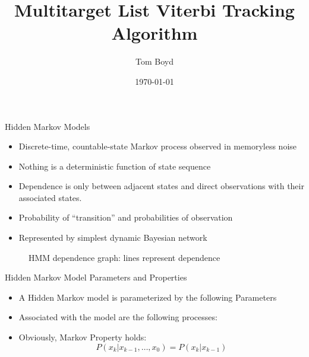 \documentclass[xetex,mathserif,serif]{beamer}
\title {Multitarget List Viterbi Tracking Algorithm}
\author {Tom Boyd}
\institute[SciTec] %
{
  SciTec Inc.\\
  100 Wall Street\\
  Princeton, NJ 08540
}
\date{\today}
\begin{document}
\frame{\titlepage}

\begin{frame}{Hidden Markov Models}
    \begin{itemize}
        \item Discrete-time, countable-state Markov process observed in
              memoryless noise
        \item Nothing is a deterministic function of state sequence
        \item Dependence is only between adjacent states and direct
              observations with their associated states.
        \item Probability of “transition” and probabilities of observation
        \item Represented by simplest dynamic Bayesian network
    \end{itemize}

    \begin{figure}
        
        \caption{HMM dependence graph: lines represent dependence}
    \end{figure}
\end{frame}

\begin{frame}{Hidden Markov Model Parameters and Properties}
    \begin{itemize}
    \item A Hidden Markov model is parameterized by the following Parameters

    \item Associated with the model are the following processes:

    \item Obviously, Markov Property holds:
    \begin{equation}
        P(x_k | x_{k-1}, \ldots, x_0) = P(x_k | x_{k-1})
    \end{equation}
    \end{itemize}
\end{frame}
\end{document}
